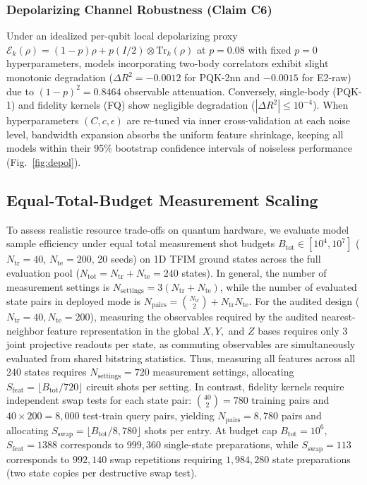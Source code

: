 \documentclass[conference]{IEEEtran}
\begin{document}
\subsubsection{Depolarizing Channel Robustness (Claim C6)}
Under an idealized per-qubit local depolarizing proxy $\mathcal{E}_k(\rho) = (1-p)\rho + p(I/2)\otimes\text{Tr}_k(\rho)$ at $p=0.08$ with fixed $p=0$ hyperparameters, models incorporating two-body correlators exhibit slight monotonic degradation ($\Delta R^2 = -0.0012$ for PQK-2nn and $-0.0015$ for E2-raw) due to $(1-p)^2 = 0.8464$ observable attenuation. Conversely, single-body (PQK-1) and fidelity kernels (FQ) show negligible degradation ($|\Delta R^2| \le 10^{-4}$). When hyperparameters $(C, c, \epsilon)$ are re-tuned via inner cross-validation at each noise level, bandwidth expansion absorbs the uniform feature shrinkage, keeping all models within their 95\% bootstrap confidence intervals of noiseless performance (Fig.~\ref{fig:depol}).



\subsection{Equal-Total-Budget Measurement Scaling}
\label{sec:equal_budget}
To assess realistic resource trade-offs on quantum hardware, we evaluate model sample efficiency under equal total measurement shot budgets $B_{\mathrm{tot}} \in [10^4, 10^7]$ ($N_{\mathrm{tr}}=40$, $N_{\mathrm{te}}=200$, 20 seeds) on 1D TFIM ground states across the full evaluation pool ($N_{\mathrm{tot}} = N_{\mathrm{tr}} + N_{\mathrm{te}} = 240$ states). In general, the number of measurement settings is $N_{\mathrm{settings}} = 3(N_{\mathrm{tr}} + N_{\mathrm{te}})$, while the number of evaluated state pairs in deployed mode is $N_{\mathrm{pairs}} = \binom{N_{\mathrm{tr}}}{2} + N_{\mathrm{tr}} N_{\mathrm{te}}$. For the audited design ($N_{\mathrm{tr}}=40, N_{\mathrm{te}}=200$), measuring the observables required by the audited nearest-neighbor feature representation in the global $X, Y,$ and $Z$ bases requires only 3 joint projective readouts per state, as commuting observables are simultaneously evaluated from shared bitstring statistics. Thus, measuring all features across all 240 states requires $N_{\mathrm{settings}} = 720$ measurement settings, allocating $S_{\mathrm{feat}} = \lfloor B_{\mathrm{tot}} / 720 \rfloor$ circuit shots per setting. In contrast, fidelity kernels require independent swap tests for each state pair: $\binom{40}{2} = 780$ training pairs and $40 \times 200 = 8{,}000$ test-train query pairs, yielding $N_{\mathrm{pairs}} = 8{,}780$ pairs and allocating $S_{\mathrm{swap}} = \lfloor B_{\mathrm{tot}} / 8{,}780 \rfloor$ shots per entry. At budget cap $B_{\mathrm{tot}}=10^6$, $S_{\mathrm{feat}}=1388$ corresponds to $999{,}360$ single-state preparations, while $S_{\mathrm{swap}}=113$ corresponds to $992{,}140$ swap repetitions requiring $1{,}984{,}280$ state preparations (two state copies per destructive swap test).
\end{document}
